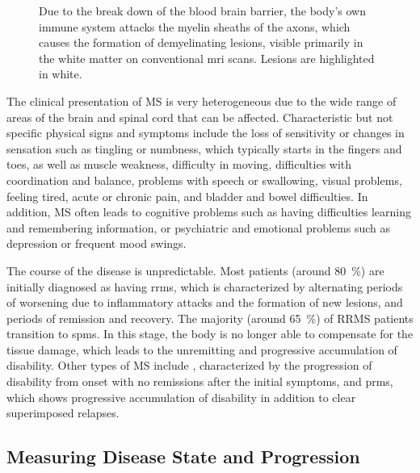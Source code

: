 \begin{figure}[tb]

\caption[Demyelination in MS]{Due to the break down of the blood brain barrier,
the body's own immune system attacks the myelin sheaths of the axons, which
causes the formation of demyelinating lesions, visible primarily in the white
matter on conventional \gls{mri} scans. Lesions are highlighted in white.}
\label{fig:ms}
\end{figure}
 
The clinical presentation of MS is very heterogeneous due to the wide range of
areas of the brain and spinal cord that can be affected. Characteristic but not
specific physical signs and symptoms include the loss of sensitivity or changes
in sensation such as tingling or numbness, which typically starts in the fingers
and toes, as well as muscle weakness, difficulty in moving, difficulties with
coordination and balance, problems with speech or swallowing, visual problems,
feeling tired, acute or chronic pain, and bladder and bowel difficulties. In
addition, MS often leads to cognitive problems such as having difficulties
learning and remembering information, or psychiatric and emotional problems such
as depression or frequent mood swings.

The course of the disease is unpredictable. Most patients (around
\SI{80}{\percent}) are initially diagnosed as having \gls{rrms}, which is
characterized by alternating periods of worsening due to inflammatory attacks
and the formation of new lesions, and periods of remission and recovery. The
majority (around \SI{65}{\percent}) of RRMS patients transition to \gls{spms}.
In this stage, the body is no longer able to compensate for the tissue damage,
which leads to the unremitting and progressive accumulation of disability. Other
types of MS include ,
characterized by the progression of disability from onset with no remissions
after the initial symptoms, and \gls{prms}, which shows progressive accumulation
of disability in addition to clear superimposed relapses.

\subsection[Measuring disease state and progression]{Measuring Disease State and
Progression}

